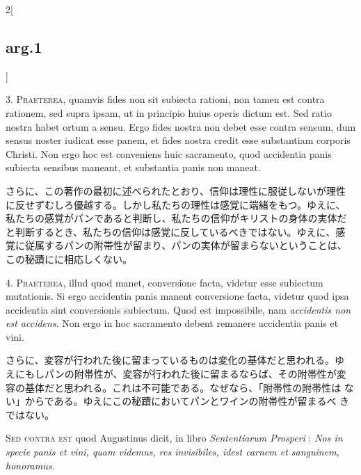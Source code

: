 \documentclass[paper=a4paper,fontsize=10pt,jafontsize=9pt,titlepage]{jlreq}
\begin{document}
\begin{paracol}{2}[\subsection{arg.1}]

3. {\scshape Praeterea}, quamvis fides non sit subiecta rationi, non
tamen est contra rationem, sed supra ipsam, ut in principio huius
operis dictum est. Sed ratio nostra habet ortum a sensu. Ergo fides
nostra non debet esse contra sensum, dum sensus noster iudicat esse
panem, et fides nostra credit esse substantiam corporis Christi. Non
ergo hoc est conveniens huic sacramento, quod accidentia panis
subiecta sensibus maneant, et substantia panis non maneat.

\switchcolumn

さらに、この著作の最初に述べられたとおり、信仰は理性に服従しないが理性
に反せずむしろ優越する。しかし私たちの理性は感覚に端緒をもつ。ゆえに、
私たちの感覚がパンであると判断し、私たちの信仰がキリストの身体の実体だ
と判断するとき、私たちの信仰は感覚に反しているべきではない。ゆえに、感
覚に従属するパンの附帯性が留まり、パンの実体が留まらないということは、
この秘蹟にに相応しくない。


4. {\scshape Praeterea}, illud quod manet, conversione facta, videtur
esse subiectum mutationis. Si ergo accidentia panis manent conversione
facta, videtur quod ipsa accidentia sint conversionis subiectum. Quod
est impossibile, nam {\itshape accidentis non est accidens}. Non ergo
in hoc sacramento debent remanere accidentia panis et vini.

\switchcolumn

さらに、変容が行われた後に留まっているものは変化の基体だと思われる。ゆ
えにもしパンの附帯性が、変容が行われた後に留まるならば、その附帯性が変
容の基体だと思われる。これは不可能である。なぜなら、「附帯性の附帯性は
ない」からである。ゆえにこの秘蹟においてパンとワインの附帯性が留まるべ
きではない。

\switchcolumn*[\subsection{s.c.}]

{\scshape Sed contra est} quod Augustinus dicit, in libro {\itshape
Sententiarum Prosperi} : {\itshape Nos in specie panis et vini, quam
videmus, res invisibiles, idest carnem et sanguinem, honoramus}.


\end{paracol}
\end{document}

